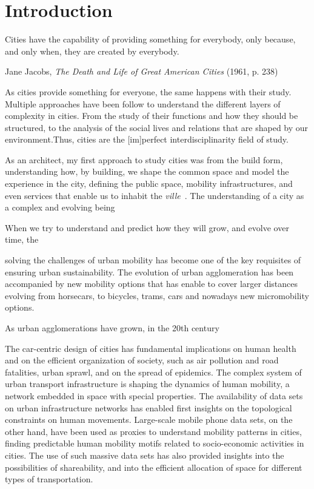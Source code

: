 \chapter{Introduction}

\epigraph{Cities have the capability of providing something for everybody, only because, and only when, they are created by everybody.}{Jane Jacobs, \textit{The Death and Life of Great American Cities} (1961, p. 238)}

As cities provide something for everyone, the same happens with their study. Multiple approaches have been follow to understand the different layers of complexity in cities. From the study of their functions and how they should be structured, to the analysis of the social lives and relations that are shaped by our environment.Thus, cities are the [im]perfect interdisciplinarity field of study.

As an architect, my first approach to study cities was from the build form, understanding how, by building, we shape the common space and model the experience in the city, defining the public space, mobility infrastructures, and even services that enable us to inhabit the \textit{ville}~\cite{sennett2018building}. The understanding of a city as a complex and evolving being 

When we try to understand and predict how they will grow, and evolve over time, the 


solving the challenges of urban mobility has become one of the key requisites of ensuring urban sustainability. The evolution of urban agglomeration has been accompanied by new mobility options that has enable to cover larger distances evolving from horsecars, to bicycles, trams, cars and nowadays new micromobility options. 

As urban agglomerations have grown, in the 20th century 


The car-centric design of cities has fundamental implications on human health and on the efficient organization of society, such as air pollution and road fatalities, urban sprawl, and on the spread of epidemics. The complex system of urban transport infrastructure is shaping the dynamics of human mobility, a network embedded in space with special properties. The availability of data sets on urban infrastructure networks has enabled first insights on the topological constraints on human movements. Large-scale mobile phone data sets, on the other hand, have been used as proxies to understand mobility patterns in cities, finding predictable human mobility motifs related to socio-economic activities in cities. The use of such massive data sets has also provided insights into the possibilities of shareability, and into the efficient allocation of space for different types of transportation.

